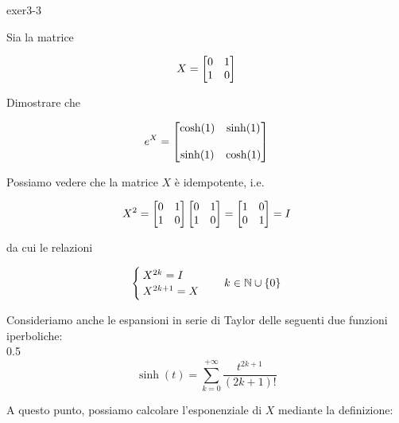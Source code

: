 {exer3-3}
{
Sia la matrice

\begin{equation}
	X = \bmqty{ %
				0 & 1 \\
				1 & 0 %
				}
\end{equation}

Dimostrare che

\begin{equation}
	e^{X} = \bmqty{ %
					\cosh(1) & \sinh(1) \\ \\
					\sinh(1) & \cosh(1) %
					}
\end{equation}
}
{
Possiamo vedere che la matrice $ X $ è idempotente, i.e.

\begin{equation}
	X^{2} = \bmqty{ %
					0 & 1 \\
					1 & 0 %
					} %
	\bmqty{ %
			0 & 1 \\
			1 & 0 %
			} %
	= \bmqty{ %
				1 & 0 \\
				0 & 1 %
				} %
	= I
\end{equation}

da cui le relazioni

\begin{equation}
	\begin{cases}
		X^{2k} = I \\
		X^{2k+1} = X
	\end{cases}
	\quad k \in \mathbb{N} \cup \{0\}
\end{equation}

Consideriamo anche le espansioni in serie di Taylor delle seguenti due funzioni iperboliche: \\

	{0.5}{%
			\begin{equation}
				\sinh(t) = \sum_{k=0}^{+\infty} \dfrac{t^{2k+1}}{(2k+1)!}
			\end{equation}
			}

A questo punto, possiamo calcolare l'esponenziale di $ X $ mediante la definizione:

}
